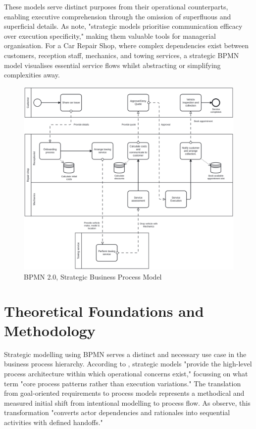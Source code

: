 \documentclass[14pt,a4paper]{article}
\begin{document}
These models serve distinct purposes from their operational counterparts, enabling executive comprehension through the omission of superfluous and superficial details. As \textit{\parencite[p. 152]{Dijkman2011}} note, "strategic models prioritise communication efficacy over execution specificity," making them valuable tools for managerial organisation. For a Car Repair Shop, where complex dependencies exist between customers, reception staff, mechanics, and towing services, a strategic BPMN model visualises essential service flows whilst abstracting or simplifying complexities away.


\begin{figure}[ht]
  \hspace{-6.5em}
    \begin{minipage}[t]{1.3\textwidth}
        \includegraphics[width=\linewidth]{strategic.png}
        \caption{BPMN 2.0, Strategic Business Process Model}
    \end{minipage}
\end{figure}

\section{Theoretical Foundations and Methodology}

Strategic modelling using BPMN serves a distinct and necessary use case in the business process hierarchy. According to \textit{\parencite[p. 17]{Allweyer2016}}, strategic models "provide the high-level process architecture within which operational concerns exist," focussing on what \textit{\parencite[p. 89]{Dumas2018}} term "core process patterns rather than execution variations." The translation from goal-oriented requirements to process models represents a methodical and measured initial shift from intentional modelling to process flow. As \textit{\parencite[p. 342]{Dalpiaz2016}} observe, this transformation "converts actor dependencies and rationales into sequential activities with defined handoffs."
\end{document}
